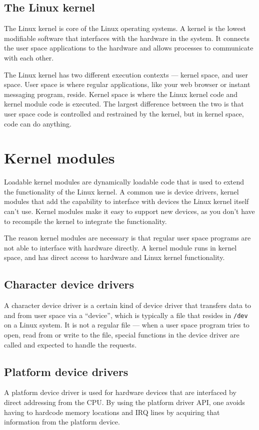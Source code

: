 \subsection{The Linux kernel}
The Linux kernel is core of the Linux operating systems. A kernel is the lowest modifiable software that interfaces with the hardware in the system. It connects the user space applications to the hardware and allows processes to communicate with each other.

The Linux kernel has two different execution contexts --- kernel space, and user space. User space is where regular applications, like your web browser or instant messaging program, reside. Kernel space is where the Linux kernel code and kernel module code is executed. The largest difference between the two is that user space code is controlled and restrained by the kernel, but in kernel space, code can do anything.

\section{Kernel modules}
Loadable kernel modules are dynamically loadable code that is used to extend the functionality of the Linux kernel. A common use is device drivers, kernel modules that add the capability to interface with devices the Linux kernel itself can't use. Kernel modules make it easy to support new devices, as you don't have to recompile the kernel to integrate the functionality.

The reason kernel modules are necessary is that regular user space programs are not able to interface with hardware directly. A kernel module runs in kernel space, and has direct access to hardware and Linux kernel functionality.

\subsection{Character device drivers}
A character device driver is a certain kind of device driver that transfers data to and from user space via a ``device'', which is typically a file that resides in \texttt{/dev} on a Linux system. It is not a regular file --- when a user space program tries to open, read from or write to the file, special functions in the device driver are called and expected to handle the requests.

\subsection{Platform device drivers}
A platform device driver is used for hardware devices that are interfaced by direct addressing from the CPU\cite{kernelplatformdrivers}. By using the platform driver API, one avoids having to hardcode memory locations and IRQ lines by acquiring that information from the platform device.

